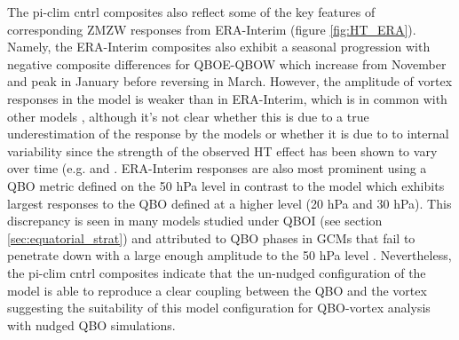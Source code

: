 The pi-clim cntrl composites also reflect some of the key features of corresponding ZMZW responses from ERA-Interim (figure \ref{fig:HT_ERA}). Namely, the ERA-Interim composites also exhibit a seasonal progression with negative composite differences for QBOE-QBOW which increase from November and peak in January before reversing in March. However, the amplitude of vortex responses in the model is weaker than in ERA-Interim, which is in common with other models \citep{ansteyTeleconnections2021}, although it's not clear whether this is due to a true underestimation of the response by the models or whether it is due to to internal variability since the strength of the observed HT effect has been shown to vary over time (e.g. \cite{luDecadalscale2008c} and \cite{luMechanisms2014c}. ERA-Interim responses are also most prominent using a QBO metric defined on the 50 hPa level in contrast to the model which exhibits largest responses to the QBO defined at a higher level (20 hPa and 30 hPa). This discrepancy is seen in many models studied under QBOI (see section \ref{sec:equatorial_strat}) and attributed to QBO phases in GCMs that fail to penetrate down with a large enough amplitude to the 50 hPa level \citep{ansteyTeleconnections2021}. Nevertheless, the pi-clim cntrl composites indicate that the un-nudged configuration of the model is able to reproduce a clear coupling between the QBO and the vortex suggesting the suitability of this model configuration for QBO-vortex analysis with nudged QBO simulations.

